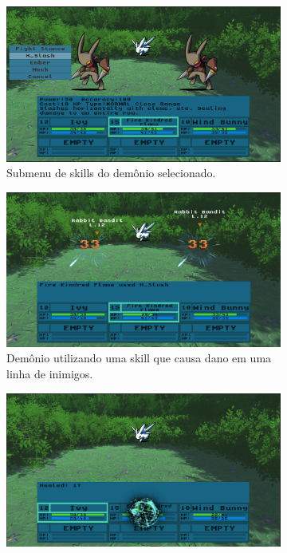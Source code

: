 \begin{figure}[h!]
  \centering
  \begin{subfigure}[b]{0.49\linewidth}
    \includegraphics[width=\linewidth]{skillmenu.jpg}
     \caption{Submenu de skills do demônio selecionado.}
  \end{subfigure}
  \begin{subfigure}[b]{0.49\linewidth}
    \includegraphics[width=\linewidth]{aoe.jpg}
    \caption{Demônio utilizando uma skill que causa dano em uma linha de inimigos.}
  \end{subfigure}
  \begin{subfigure}[b]{0.49\linewidth}
    \includegraphics[width=\linewidth]{heal.jpg}

\end{subfigure}
\end{figure}
